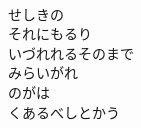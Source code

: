 \documentclass[10pt,b5j]{tarticle} %
\begin{document}
\begin{enumerate}
\begin{minipage}[c]{\blocksize}
    \end{minipage}
    \begin{minipage}[c]{\blocksize}
        
        \vspace{\linespace}
        \item~\\
        せしきの\\
        それにもるり\\
        いづれれるそのまで\\
        みらいがれ\\
        のがは\\
        くあるべしとかう 

    
    \end{minipage}
\end{enumerate} %
\end{document}
